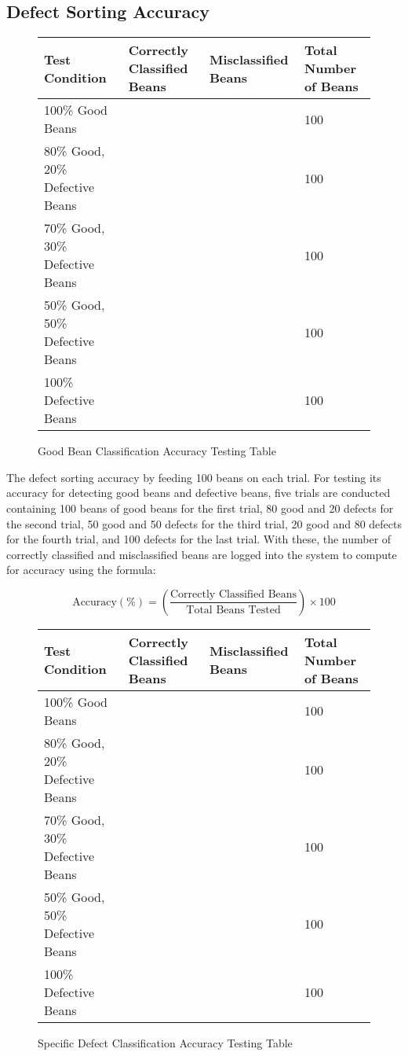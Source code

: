\subsection{Defect Sorting Accuracy}


\begin{figure}[H]
	\centering
	\begin{tabularx}{\textwidth}{p{}|p{}|p{}|p{}}
		\caption{Good Bean Classification Accuracy Testing Table} \label{tab:good_accuracy_testing} \\
		\hline \hline
		\textbf{Test Condition} & \textbf{Correctly Classified Beans} & \textbf{Misclassified Beans} & \textbf{Total Number of Beans} \\
		\hline
		100\% Good Beans &  &  & 100\\
		\hline
		80\% Good, 20\% Defective Beans & & & 100 \\
		\hline
		70\% Good, 30\% Defective Beans & & & 100 \\
		\hline
		50\% Good, 50\% Defective Beans & & & 100 \\
		\hline
		100\% Defective Beans & & & 100 \\
		\hline
	\end{tabularx}
\end{figure}

The defect sorting accuracy by feeding 100 beans on each trial. For testing its accuracy for detecting good beans and defective beans, five trials are conducted containing 100 beans of good beans for the first trial, 80 good and 20 defects for the second trial, 50 good and 50 defects for the third trial, 20 good and 80 defects for the fourth trial, and 100 defects for the last trial. With these, the number of correctly classified and misclassified beans are logged into the system to compute for accuracy using the formula:

\begin{equation}
	\text{Accuracy} (\%) = \left( \frac{\text{Correctly Classified Beans}}{\text{Total Beans Tested}} \right) \times 100
\end{equation}

\begin{figure}[H]
	\centering
	\begin{tabularx}{\textwidth}{p{}|p{}|p{}|p{}}
		\caption{Specific Defect Classification Accuracy Testing Table} \label{tab:defect_accuracy_testing} \\
		\hline \hline
		\textbf{Test Condition} & \textbf{Correctly Classified Beans} & \textbf{Misclassified Beans} & \textbf{Total Number of Beans} \\
		\hline
		100\% Good Beans &  &  & 100 \\
		\hline
		80\% Good, 20\% Defective Beans & & & 100 \\
		\hline
		70\% Good, 30\% Defective Beans & & & 100 \\
		\hline
		50\% Good, 50\% Defective Beans & & & 100 \\
		\hline
		100\% Defective Beans & & & 100 \\
		\hline
	\end{tabularx}
\end{figure}

